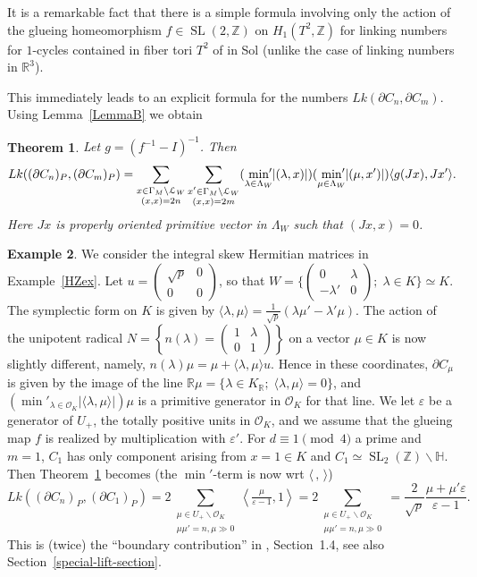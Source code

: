 \documentclass[12pt,leqno]{amsart}
\numberwithin{equation}{section}
\theoremstyle{plain}
\newtheorem{theorem}{Theorem}[section]
\theoremstyle{definition}
\newtheorem{example}[theorem]{Example}
\theoremstyle{remark}
\newcommand{\R}{\mathbb{R}}
\newcommand{\Z}{\mathbb{Z}}
\newcommand{\h}{\mathbb{H}}
\newcommand{\G}{\Gamma}
\newcommand{\la}{\lambda}
\newcommand{\back}{\backslash}
\newcommand{\kzxz}[4]{\left(\begin{smallmatrix} #1 & #2 \\ #3 & #4\end{smallmatrix}\right) }
\newcommand{\eps}{\varepsilon}
\newcommand{\SL}{\operatorname{SL}}
\begin{document}
It is a remarkable fact that there is a simple formula involving only the action of the
glueing homeomorphism $f \in  \SL(2,\Z)$ on $H_1(T^2, \Z)$ for linking numbers for $1$-cycles contained in fiber tori $T^2$ of in Sol (unlike the case of linking numbers in $\R^3$). 

This immediately leads to an explicit formula for the numbers $Lk(\partial C_n, \partial C_m)$. Using Lemma~\ref{LemmaB} we obtain

\begin{theorem}\label{LinkCnCm} 
Let $g = (f^{-1} - I)^{-1}$. Then
 \[
 Lk( (\partial C_n)_P, (\partial C_m)_P) = \sum_{ \substack{x\in \G_M \back \mathcal{L}_W \\ (x,x)=2n}} \sum_{\substack{x'\in \G_M \back \mathcal{L}_W \\ (x,x)=2m}} (\min_{\lambda \in \Lambda_W}  {\hspace{-5pt}'}
 |(\lambda,x)|) (\min_{\mu \in \Lambda_W}  {\hspace{-5pt}'}
|(\mu,x')|) \langle g(Jx),Jx' \rangle. 
\]
Here $Jx$ is properly oriented primitive vector in $\Lambda_W$ such that $(Jx,x)=0$. 
 \end{theorem}

 \begin{example}\label{LinkCnCmex} 
We consider the integral skew Hermitian matrices in Example~\ref{HZex}. Let $u= \kzxz{\sqrt{p}}{0}{0}{0}$, so that $W = \{ \kzxz{0}{\la}{-\la'}{0};\; \la \in K \} \simeq K$. The symplectic form on $K$ is given by $\langle \la, \mu \rangle = \frac{1}{\sqrt{p}} (\la \mu' - \la'\mu)$. The action of the unipotent radical $N= \left\{ n(\la)= \kzxz{1}{\la}{0}{1} \right\}$ on a vector $\mu \in K$ is now slightly different, namely, $n(\la) \mu = \mu + \langle \la, \mu \rangle u$. Hence in these coordinates, $\partial C_{\mu}$ is given by the image of the line $\R \mu = \{\la \in K_\R; \; \langle \la, \mu \rangle =0 \}$, and $(\min'_{\lambda \in \mathcal{O}_K}  
 |\langle \la, \mu \rangle|)\mu$ is a primitive generator in $\mathcal{O}_K$ for that line. We let $\eps$ be a generator of $U_+$, the totally positive units in $\mathcal{O}_K$, and we assume that the glueing map $f$ is realized by multiplication with $\eps'$. For $d \equiv 1 \pmod{4}$ a prime and $m=1$, $C_1$ has only component arising from $x =1 \in K$ and $C_1 \simeq \SL_2(\Z) \back \h$. Then Theorem~\ref{LinkCnCm} becomes (the $\min'$-term is now wrt $\langle\,,\, \rangle$)
\[
 Lk( (\partial C_n)_P, (\partial C_1)_P) = 
 2 \sum_{ \substack{\mu \in U_+ \back \mathcal{O}_K\\ \mu\mu'=n, \mu \gg 0}} \left\langle \tfrac{\mu}{\eps-1}, 1 \right\rangle = 2\sum_{ \substack{\mu \in U_+ \back \mathcal{O}_K\\ \mu\mu'=n, \mu \gg0}}  = \frac{2}{\sqrt{p}}\frac{\mu+\mu'\eps}{\eps-1}.
\]
This is (twice) the ``boundary contribution'' in \cite{HZ}, Section~1.4, see also Section~\ref{special-lift-section}.
\end{example}
\end{document}
